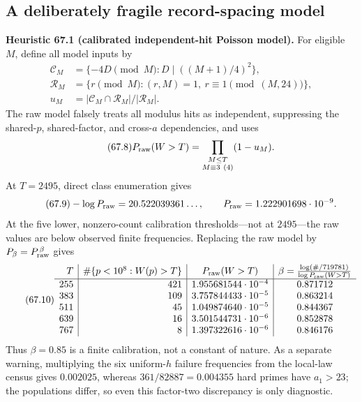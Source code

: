 \documentclass[10pt,reqno]{amsart}
\theoremstyle{definition}
\newcommand{\1}{\mathbf 1}
\begin{document}
\subsection{A deliberately fragile record-spacing model}
\medskip\noindent\textbf{Heuristic 67.1 (calibrated independent-hit Poisson
model).}
For eligible $M$, define all model inputs by
\begin{equation}\tag{67.7}
 \begin{split}
 \mathcal C_M&=\{-4D\pmod M:D\mid((M+1)/4)^2\},\\
 \mathcal R_M&=\{r\pmod M:(r,M)=1,\ r\equiv1\pmod{(M,24)}\},\\
 u_M&=|\mathcal C_M\cap\mathcal R_M|/|\mathcal R_M|.
 \end{split}
\end{equation}
The raw model falsely treats all modulus hits as independent, suppressing
the shared-$p$, shared-factor, and cross-$a$ dependencies, and uses
\begin{equation}\tag{67.8}
 P_{\rm raw}(W>T)=\prod_{\substack{M\leq T\\M\equiv3\ (4)}}(1-u_M).
\end{equation}
At $T=2495$, direct class enumeration gives
\begin{equation}\tag{67.9}
 -\log P_{\rm raw}=20.522039361\ldots,\qquad
 P_{\rm raw}=1.222901698\cdot10^{-9}.
\end{equation}
At the five lower, nonzero-count calibration thresholds---not at $2495$---the
raw values are below observed finite frequencies.  Replacing the raw model
by $P_\beta=P_{\rm raw}^{\,\beta}$ gives
\begin{equation}\tag{67.10}
\begin{array}{r|r|c|c}
T&\#\{p<10^8:W(p)>T\}&P_{\rm raw}(W>T)&
 \beta={\log(\#/719781)\over\log P_{\rm raw}(W>T)}\\ \hline
255&421&1.955681544\cdot10^{-4}&0.871712\\
383&109&3.757844433\cdot10^{-5}&0.863214\\
511&45&1.049874640\cdot10^{-5}&0.844367\\
639&16&3.501544731\cdot10^{-6}&0.852878\\
767&8&1.397322616\cdot10^{-6}&0.846176
\end{array}
\end{equation}
Thus $\beta=0.85$ is a finite calibration, not a constant of nature.  As a
separate warning, multiplying the six uniform-$h$ failure frequencies from
the local-law census gives $0.002025$, whereas $361/82887=0.004355$ hard
primes have $a_1>23$; the populations differ, so even this factor-two
discrepancy is only diagnostic.
\end{document}

